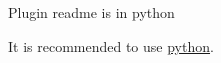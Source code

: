 Plugin readme is in python

It is recommended to use \hyperlink{md_src_plugins_python_README_src_plugins_python_README_md}{python}. 